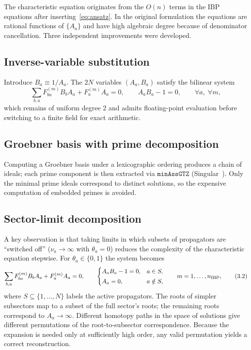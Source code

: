 \documentclass[12pt]{article}
\begin{document}
The characteristic equation originates from the $O(n)$ terms in the IBP equations
after inserting~\eqref{eq:ansatz}.  In the original formulation the equations are
rational functions of $\{A_a\}$ and have high algebraic degree because of
denominator cancellation.  Three independent improvements were developed.

\subsection{Inverse-variable substitution}

Introduce $B_a\equiv 1/A_a$.  The $2N$ variables $(A_a,B_a)$ satisfy the bilinear
system
\[
  \sum_{b,a}F_{ba}^{(m)}B_bA_a + F_a^{(m)}A_a = 0,
  \qquad A_aB_a-1=0,
  \qquad \forall a,\; \forall m ,
\tag{3.1}\label{eq:bilinear}
\]
which remains of uniform degree 2 and admits floating-point evaluation before
switching to a finite field for exact arithmetic.

\subsection{Groebner basis with prime decomposition}

Computing a Groebner basis under a lexicographic ordering produces a chain of
ideals; each prime component is then extracted via
$\texttt{minAssGTZ}$ (Singular~\cite{DGPS}).  Only the minimal prime ideals
correspond to distinct solutions, so the expensive computation of embedded
primes is avoided.

\subsection{Sector-limit decomposition}

A key observation is that taking limits in which subsets of propagators are
``switched off'' ($\nu_a\to\infty$ with $\theta_a=0$) reduces the complexity of
the characteristic equation stepwise.  For $\theta_a\in\{0,1\}$ the system
becomes
\[
  \sum_{b,a}F_{ba}^{(m)}B_bA_a + F_a^{(m)}A_a = 0,
  \qquad
  \begin{cases}
    A_aB_a-1=0, & a\in S,\\[2pt]
    A_a=0,      & a\notin S,
  \end{cases}
  \qquad m=1,\ldots,n_{\rm IBP},
\tag{3.2}\label{eq:sector_limit}
\]
where $S\subseteq\{1,\ldots,N\}$ labels the active propagators.  The roots of
simpler subsectors map to a subset of the full sector's roots; the remaining
roots correspond to $A_a\to\infty$.  Different homotopy paths in the space of
solutions give different permutations of the root-to-subsector correspondence.
Because the expansion is needed only at sufficiently high order, any valid
permutation yields a correct reconstruction.
\end{document}
